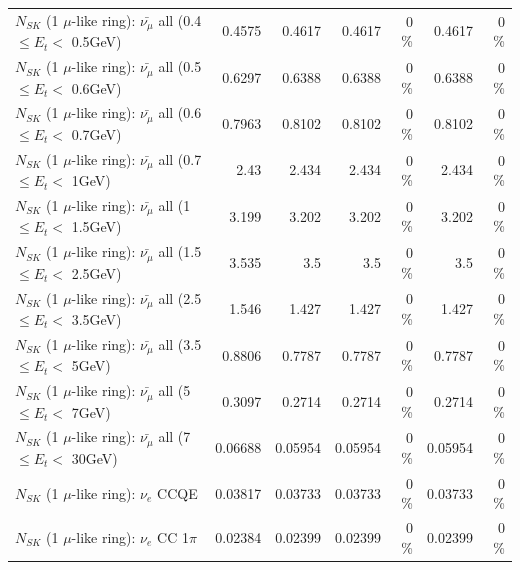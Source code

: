 \begin{table}
\begin{tabular}{| l | r | r | r  r | r  r |}
 $N_{SK}$ (1 $\mu$-like ring): $\bar{\nu_{\mu}}$ all (0.4 $\leq E_{t} <$ 0.5GeV) &          0.4575 &          0.4617 &          0.4617 &        0 \%  &          0.4617 &        0 \%  \\ 
 $N_{SK}$ (1 $\mu$-like ring): $\bar{\nu_{\mu}}$ all (0.5 $\leq E_{t} <$ 0.6GeV) &          0.6297 &          0.6388 &          0.6388 &        0 \%  &          0.6388 &        0 \%  \\ 
 $N_{SK}$ (1 $\mu$-like ring): $\bar{\nu_{\mu}}$ all (0.6 $\leq E_{t} <$ 0.7GeV) &          0.7963 &          0.8102 &          0.8102 &        0 \%  &          0.8102 &        0 \%  \\ 
   $N_{SK}$ (1 $\mu$-like ring): $\bar{\nu_{\mu}}$ all (0.7 $\leq E_{t} <$ 1GeV) &            2.43 &           2.434 &           2.434 &        0 \%  &           2.434 &        0 \%  \\ 
   $N_{SK}$ (1 $\mu$-like ring): $\bar{\nu_{\mu}}$ all (1 $\leq E_{t} <$ 1.5GeV) &           3.199 &           3.202 &           3.202 &        0 \%  &           3.202 &        0 \%  \\ 
 $N_{SK}$ (1 $\mu$-like ring): $\bar{\nu_{\mu}}$ all (1.5 $\leq E_{t} <$ 2.5GeV) &           3.535 &             3.5 &             3.5 &        0 \%  &             3.5 &        0 \%  \\ 
 $N_{SK}$ (1 $\mu$-like ring): $\bar{\nu_{\mu}}$ all (2.5 $\leq E_{t} <$ 3.5GeV) &           1.546 &           1.427 &           1.427 &        0 \%  &           1.427 &        0 \%  \\ 
   $N_{SK}$ (1 $\mu$-like ring): $\bar{\nu_{\mu}}$ all (3.5 $\leq E_{t} <$ 5GeV) &          0.8806 &          0.7787 &          0.7787 &        0 \%  &          0.7787 &        0 \%  \\ 
     $N_{SK}$ (1 $\mu$-like ring): $\bar{\nu_{\mu}}$ all (5 $\leq E_{t} <$ 7GeV) &          0.3097 &          0.2714 &          0.2714 &        0 \%  &          0.2714 &        0 \%  \\ 
    $N_{SK}$ (1 $\mu$-like ring): $\bar{\nu_{\mu}}$ all (7 $\leq E_{t} <$ 30GeV) &         0.06688 &         0.05954 &         0.05954 &        0 \%  &         0.05954 &        0 \%  \\ 
\hline
\hline
\hline
                                      $N_{SK}$ (1 $\mu$-like ring): $\nu_e$ CCQE &         0.03817 &         0.03733 &         0.03733 &        0 \%  &         0.03733 &        0 \%  \\ 
                                 $N_{SK}$ (1 $\mu$-like ring): $\nu_e$ CC 1$\pi$ &         0.02384 &         0.02399 &         0.02399 &        0 \%  &         0.02399 &        0 \%  \\ 

\end{tabular}
\end{table}
